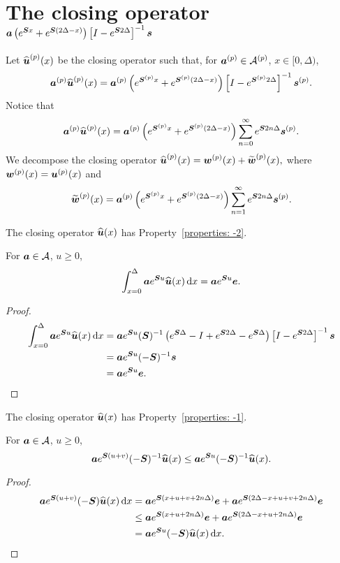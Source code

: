 \section{The closing operator \(\boldsymbol a  \left(e^{\boldsymbol{S} x} + e^{\boldsymbol{S} (2\Delta-x)}\right)\left[I-e^{\boldsymbol S  2\Delta}\right]^{-1}\boldsymbol s \)}

Let \(\widehat{\boldsymbol u}^{(p)}(x)\) be the closing operator such that, for \(\boldsymbol a^{(p)} \in\mathcal A^{(p)}\), \(x\in[0,\Delta)\),
\[\boldsymbol a^{(p)} \widehat{\boldsymbol u}^{(p)}(x) = \boldsymbol a^{(p)} \left(e^{\boldsymbol{S}^{(p)}x} + e^{\boldsymbol{S}^{(p)}(2\Delta-x)}\right)\left[I-e^{\boldsymbol S^{(p)} 2\Delta}\right]^{-1}\boldsymbol s^{(p)}.\]
Notice that 
\[\boldsymbol a^{(p)} \widehat{\boldsymbol u}^{(p)}(x) = \boldsymbol a^{(p)} \left(e^{\boldsymbol{S}^{(p)}x} + e^{\boldsymbol{S}^{(p)}(2\Delta-x)}\right)\sum_{n=0}^\infty e^{\boldsymbol S2n\Delta}\boldsymbol s^{(p)}.\]
We decompose the closing operator \(\displaystyle \widehat{\boldsymbol u}^{(p)}(x)=\boldsymbol w^{(p)}(x)+\widetilde{\boldsymbol w}^{(p)}(x),\) where \(\boldsymbol w^{(p)}(x) = \boldsymbol u^{(p)}(x)\) and 
\[\widetilde{\boldsymbol w}^{(p)}(x) = \boldsymbol a^{(p)} \left(e^{\boldsymbol{S}^{(p)}x} + e^{\boldsymbol{S}^{(p)}(2\Delta-x)}\right)\sum_{n=1}^\infty e^{\boldsymbol S2n\Delta}\boldsymbol s^{(p)}.\]

\begin{lem}
	The closing operator \(\widehat{\boldsymbol u}(x)\) has Property~\ref{properties: -2}.
	
	For \(\boldsymbol a \in\mathcal A\), \(u\geq 0\), 
	\[\int_{x=0}^\Delta \boldsymbol a e^{\boldsymbol Su}\widehat{\boldsymbol u}(x)\, \mathrm{d} x =\boldsymbol a e^{\boldsymbol Su}\boldsymbol e. \]
\end{lem}
\begin{proof}
	\begin{align*}
		\int_{x=0}^\Delta \boldsymbol a e^{\boldsymbol Su}\widehat{\boldsymbol u}(x)\, \mathrm{d} x &= \boldsymbol a  e^{\boldsymbol Su} (\boldsymbol S)^{-1} \left( e^{\boldsymbol S\Delta} - I + e^{\boldsymbol S2\Delta} - e^{\boldsymbol S\Delta}\right)\left[I-e^{\boldsymbol S  2\Delta}\right]^{-1}\boldsymbol s
		\\ &= \boldsymbol a  e^{\boldsymbol Su}(-\boldsymbol S)^{-1}\boldsymbol s
		\\ &= \boldsymbol a  e^{\boldsymbol Su}\boldsymbol e.
	\end{align*}
\end{proof}

\begin{lem}
	The closing operator \(\widehat{\boldsymbol u}(x)\) has Property~\ref{properties: -1}.
	
	For \(\boldsymbol a \in\mathcal A\), \(u\geq 0\), 
	\[\boldsymbol a e^{\boldsymbol S(u+v)}(-\boldsymbol S)^{-1}\widehat{\boldsymbol u}(x) \leq \boldsymbol a e^{\boldsymbol Su}(-\boldsymbol S)^{-1}\widehat{\boldsymbol u}(x) . \]
\end{lem}
\begin{proof}
	\begin{align*}
		 \boldsymbol a e^{\boldsymbol S(u+v)}(-\boldsymbol S)\widehat{\boldsymbol u}(x)\, \mathrm{d} x &= \boldsymbol a e^{\boldsymbol S(x+u+v+2n\Delta)}\boldsymbol e + \boldsymbol a  e^{\boldsymbol S(2\Delta-x + u + v + 2n\Delta)} \boldsymbol e
		\\ &\leq \boldsymbol a e^{\boldsymbol S(x+u+2n\Delta)}\boldsymbol e + \boldsymbol a  e^{\boldsymbol S(2\Delta-x + u + 2n\Delta)} \boldsymbol e
		\\ &= \boldsymbol a e^{\boldsymbol Su}(-\boldsymbol S)\widehat{\boldsymbol u}(x)\, \mathrm{d} x.
	\end{align*}
\end{proof}

